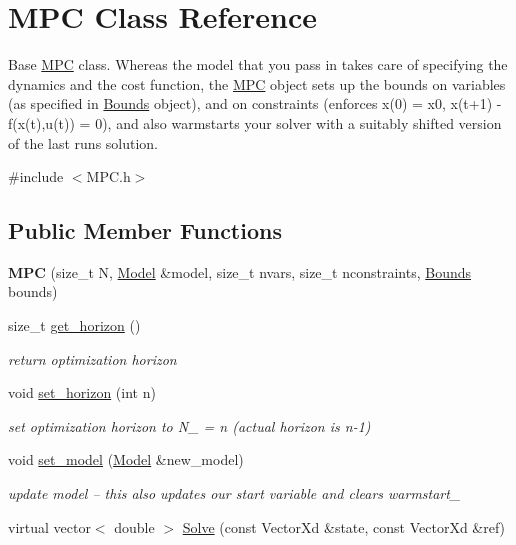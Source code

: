 \hypertarget{classMPC}{}\section{M\+PC Class Reference}
\label{classMPC}


Base \mbox{\hyperlink{classMPC}{M\+PC}} class. Whereas the model that you pass in takes care of specifying the dynamics and the cost function, the \mbox{\hyperlink{classMPC}{M\+PC}} object sets up the bounds on variables (as specified in \mbox{\hyperlink{structBounds}{Bounds}} object), and on constraints (enforces x(0) = x0, x(t+1) -\/ f(x(t),u(t)) = 0), and also warmstarts your solver with a suitably shifted version of the last run\textquotesingle{}s solution.  




{\ttfamily \#include $<$M\+P\+C.\+h$>$}

\subsection*{Public Member Functions}
\begin{DoxyCompactItemize}
\item 
\mbox{\label{classMPC_a2eb1e1066f5f8fa21b749c8fd7f65214}} 
{\bfseries M\+PC} (size\+\_\+t N, \mbox{\hyperlink{classModel}{Model}} \&model, size\+\_\+t nvars, size\+\_\+t nconstraints, \mbox{\hyperlink{structBounds}{Bounds}} bounds)
\item 
\mbox{\label{classMPC_a72dfd8e42f90e52188826e28b4a9ef12}} 
size\+\_\+t \mbox{\hyperlink{classMPC_a72dfd8e42f90e52188826e28b4a9ef12}{get\+\_\+horizon}} ()
\begin{DoxyCompactList}\small\item\em return optimization horizon \end{DoxyCompactList}\item 
\mbox{\label{classMPC_aa12974d3c66958fb98d9fc5a6a5248de}} 
void \mbox{\hyperlink{classMPC_aa12974d3c66958fb98d9fc5a6a5248de}{set\+\_\+horizon}} (int n)
\begin{DoxyCompactList}\small\item\em set optimization horizon to N\+\_\+ = n (actual horizon is n-\/1) \end{DoxyCompactList}\item 
\mbox{\label{classMPC_a9ed8c79c43f0b26ba9ac8ed70bb50b73}} 
void \mbox{\hyperlink{classMPC_a9ed8c79c43f0b26ba9ac8ed70bb50b73}{set\+\_\+model}} (\mbox{\hyperlink{classModel}{Model}} \&new\+\_\+model)
\begin{DoxyCompactList}\small\item\em update model -- this also updates our start variable and clears warmstart\+\_\+ \end{DoxyCompactList}\item 
virtual vector$<$ double $>$ \mbox{\hyperlink{classMPC_ae07d02edbf31f94d738cfa206e5b2d77}{Solve}} (const Vector\+Xd \&state, const Vector\+Xd \&ref)
\end{DoxyCompactItemize}
